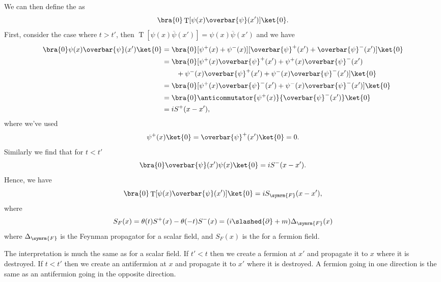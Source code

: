 \documentclass[fleqn]{NotesClass}
\newcommand{\heaviside}{\theta}
\DeclareMathOperator{\timeOrdering}{T}
\newcommand{\feynman}{\symrm{F}}
\newcommand{\diracadjoint}[1]{\overbar{#1}}
\begin{document}
    We can then define the  as
    \begin{equation}
        \bra{0} \timeOrdering[\psi(x) \diracadjoint{\psi}(x')] \ket{0}.
    \end{equation}
    First, consider the case where \(t > t'\), then \(\timeOrdering[\psi(x) \diracadjoint{\psi}(x')] = \psi(x) \diracadjoint{\psi}(x')\) and we have
    \begin{align}
        \bra{0} \psi(x) \diracadjoint{\psi}(x') \ket{0} &= \bra{0} [\psi^+(x) + \psi^-(x)][\diracadjoint{\psi}^+(x') + \diracadjoint{\psi}^-(x')]\ket{0}\\
        &= \bra{0} [\psi^+(x)\diracadjoint{\psi}^+(x') + \psi^+(x)\diracadjoint{\psi}^-(x')\\
        &\qquad + \psi^-(x)\diracadjoint{\psi}^+(x') + \psi^-(x)\diracadjoint{\psi}^-(x')]\ket{0}\\
        &= \bra{0} [\psi^+(x)\diracadjoint{\psi}^-(x') + \psi^-(x)\diracadjoint{\psi}^-(x')]\ket{0}\\
        &= \bra{0} \anticommutator{\psi^+(x)}{\diracadjoint{\psi}^-(x')} \ket{0}\\
        &= iS^+(x - x'),
    \end{align}
    where we've used
    \begin{equation}
        \psi^+(x)\ket{0} = \diracadjoint{\psi}^+(x') \ket{0} = 0.
    \end{equation}
    Similarly we find that for \(t < t'\)
    \begin{equation}
        \bra{0} \diracadjoint{\psi}(x') \psi(x) \ket{0} = iS^-(x - x').
    \end{equation}
    Hence, we have
    \begin{equation}
        \bra{0} \timeOrdering[\psi(x) \diracadjoint{\psi}(x')] \ket{0} = i S_{\feynman}(x - x'),
    \end{equation}
    where
    \begin{equation}
        S_F(x) = \heaviside(t) S^+(x) - \heaviside(-t) S^-(x) = (i\slashed{\partial} + m) \Delta_{\feynman}(x)
    \end{equation}
    where \(\Delta_{\feynman}\) is the Feynman propagator for a scalar field, and \(S_F(x)\) is the  for a fermion field.
    
    The interpretation is much the same as for a scalar field.
    If \(t' < t\) then we create a fermion at \(x'\) and propagate it to \(x\) where it is destroyed.
    If \(t < t'\) then we create an antifermion at \(x\) and propagate it to \(x'\) where it is destroyed.
    A fermion going in one direction is the same as an antifermion going in the opposite direction.
    
\end{document}
